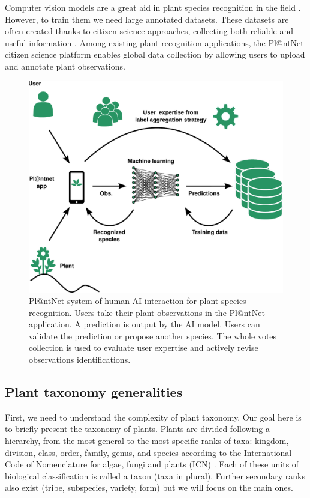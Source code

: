 Computer vision models are a great aid in plant species recognition in the field \citep{vidal2021perspectives,borowiec2022}.
However, to train them we need large annotated datasets.
These datasets are often created thanks to citizen science approaches, collecting both reliable and useful information \citep{brown2019potential}.
Among existing plant recognition applications, the Pl@ntNet citizen science platform \citep{affouard2017pl} enables global data collection by allowing users to upload and annotate plant observations.

\begin{figure}[htb]
    \centering
    \includegraphics[width=.75\linewidth]{images/plantnet_schema_global_green.pdf}
    \caption{Pl@ntNet system of human-AI interaction for plant species recognition. Users take their plant observations in the Pl@ntNet application. A prediction is output by the AI model. Users can validate the prediction or propose another species. The whole votes collection is used to evaluate user expertise and actively revise observations identifications.}
    \label{fig:plantnet-system}
\end{figure}

\subsection{Plant taxonomy generalities}
First, we need to understand the complexity of plant taxonomy.
Our goal here is to briefly present the taxonomy of plants.
Plants are divided following a hierarchy, from the most general to the most specific ranks of taxa: kingdom, division, class, order, family, genus, and species according to the International Code of Nomenclature for algae, fungi and plants (ICN) \citep{turland2018international}.
Each of these units of biological classification is called a taxon (taxa in plural).
Further secondary ranks also exist (tribe, subspecies, variety, form) but we will focus on the main ones.

